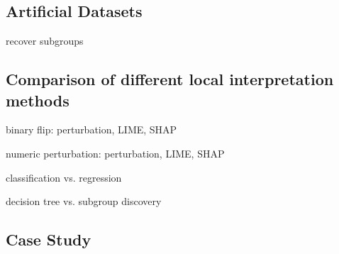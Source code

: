 \subsection{Artificial Datasets}
recover subgroups

\subsection{Comparison of different local interpretation methods}
binary flip: perturbation, LIME, SHAP

numeric perturbation: perturbation, LIME, SHAP

classification vs. regression

decision tree vs. subgroup discovery

\subsection{Case Study}
